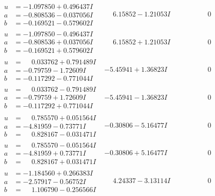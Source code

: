 \documentclass[1p]{elsarticle_modified}
\theoremstyle{definition}
\begin{document}
$$\begin{array}{c|c|c}
\begin{aligned}
u &= -1.097850 + 0.496437 I \\
a &= -0.808536 - 0.037056 I \\
b &= -0.169521 - 0.579602 I\end{aligned}
 & \phantom{-}6.15852 - 1.21053 I & \phantom{-0.000000 } 0 \\ \hline\begin{aligned}
u &= -1.097850 - 0.496437 I \\
a &= -0.808536 + 0.037056 I \\
b &= -0.169521 + 0.579602 I\end{aligned}
 & \phantom{-}6.15852 + 1.21053 I & \phantom{-0.000000 } 0 \\ \hline\begin{aligned}
u &= \phantom{-}0.033762 + 0.791489 I \\
a &= -0.79759 - 1.72609 I \\
b &= -0.117292 - 0.771044 I\end{aligned}
 & -5.45941 + 1.36823 I & \phantom{-0.000000 } 0 \\ \hline\begin{aligned}
u &= \phantom{-}0.033762 - 0.791489 I \\
a &= -0.79759 + 1.72609 I \\
b &= -0.117292 + 0.771044 I\end{aligned}
 & -5.45941 - 1.36823 I & \phantom{-0.000000 } 0 \\ \hline\begin{aligned}
u &= \phantom{-}0.785570 + 0.051564 I \\
a &= -4.81959 - 0.73771 I \\
b &= \phantom{-}0.828167 - 0.031471 I\end{aligned}
 & -0.30806 - 5.16477 I & \phantom{-0.000000 } 0 \\ \hline\begin{aligned}
u &= \phantom{-}0.785570 - 0.051564 I \\
a &= -4.81959 + 0.73771 I \\
b &= \phantom{-}0.828167 + 0.031471 I\end{aligned}
 & -0.30806 + 5.16477 I & \phantom{-0.000000 } 0 \\ \hline\begin{aligned}
u &= -1.184560 + 0.266383 I \\
a &= -2.57917 - 0.56752 I \\
b &= \phantom{-}1.106790 - 0.256566 I\end{aligned}
 & \phantom{-}4.24337 - 3.13114 I & \phantom{-0.000000 } 0 \\ \hline\begin{aligned}

\end{aligned}
\end{array}$$
\end{document}
